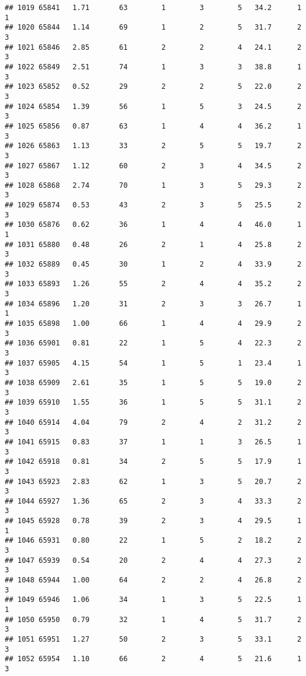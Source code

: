 \documentclass[
]{article}
\begin{document}
\begin{verbatim}
## 1019 65841   1.71       63        1        3        5   34.2      1      1
## 1020 65844   1.14       69        1        2        5   31.7      2      3
## 1021 65846   2.85       61        2        2        4   24.1      2      3
## 1022 65849   2.51       74        1        3        3   38.8      1      3
## 1023 65852   0.52       29        2        2        5   22.0      2      3
## 1024 65854   1.39       56        1        5        3   24.5      2      3
## 1025 65856   0.87       63        1        4        4   36.2      1      3
## 1026 65863   1.13       33        2        5        5   19.7      2      3
## 1027 65867   1.12       60        2        3        4   34.5      2      3
## 1028 65868   2.74       70        1        3        5   29.3      2      3
## 1029 65874   0.53       43        2        3        5   25.5      2      3
## 1030 65876   0.62       36        1        4        4   46.0      1      1
## 1031 65880   0.48       26        2        1        4   25.8      2      3
## 1032 65889   0.45       30        1        2        4   33.9      2      3
## 1033 65893   1.26       55        2        4        4   35.2      2      3
## 1034 65896   1.20       31        2        3        3   26.7      1      1
## 1035 65898   1.00       66        1        4        4   29.9      2      3
## 1036 65901   0.81       22        1        5        4   22.3      2      3
## 1037 65905   4.15       54        1        5        1   23.4      1      3
## 1038 65909   2.61       35        1        5        5   19.0      2      3
## 1039 65910   1.55       36        1        5        5   31.1      2      3
## 1040 65914   4.04       79        2        4        2   31.2      2      3
## 1041 65915   0.83       37        1        1        3   26.5      1      3
## 1042 65918   0.81       34        2        5        5   17.9      1      3
## 1043 65923   2.83       62        1        3        5   20.7      2      3
## 1044 65927   1.36       65        2        3        4   33.3      2      3
## 1045 65928   0.78       39        2        3        4   29.5      1      1
## 1046 65931   0.80       22        1        5        2   18.2      2      3
## 1047 65939   0.54       20        2        4        4   27.3      2      3
## 1048 65944   1.00       64        2        2        4   26.8      2      3
## 1049 65946   1.06       34        1        3        5   22.5      1      1
## 1050 65950   0.79       32        1        4        5   31.7      2      3
## 1051 65951   1.27       50        2        3        5   33.1      2      3
## 1052 65954   1.10       66        2        4        5   21.6      1      3

\end{verbatim}
\end{document}
